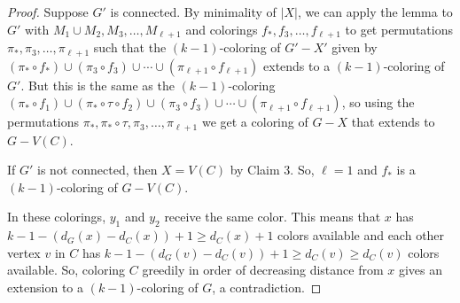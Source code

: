 \documentclass[12pt]{article}
\theoremstyle{plain}
\theoremstyle{definition}
\theoremstyle{remark}
\begin{document}
\begin{proof}
Suppose $G'$ is connected. By minimality of $|X|$, we can apply the lemma to $G'$ with $M_1 \cup M_2, M_3, \ldots, M_{\ell + 1}$ and colorings $f_*, f_3, \ldots, f_{\ell +1}$ to get permutations $\pi_*, \pi_3, \ldots, \pi_{\ell+1}$ such that the $(k-1)$-coloring of $G'-X'$ given by $(\pi_* \circ f_*) \cup (\pi_3 \circ f_3) \cup \cdots \cup (\pi_{\ell + 1} \circ f_{\ell + 1})$ extends to a $(k - 1)$-coloring of $G'$.  But this is the same as the $(k-1)$-coloring $(\pi_* \circ f_1) \cup (\pi_* \circ \tau \circ f_2) \cup (\pi_3 \circ f_3) \cup \cdots \cup (\pi_{\ell + 1} \circ f_{\ell + 1})$, so using the permutations $\pi_*, \pi_* \circ \tau, \pi_3, \ldots, \pi_{\ell + 1}$ we get a coloring of $G - X$ that extends to $G - V(C)$.  

If $G'$ is not connected, then $X = V(C)$ by Claim 3.  So, $\ell = 1$ and $f_*$ is a $(k-1)$-coloring of $G-V(C)$.

In these colorings, $y_1$ and $y_2$ receive the same color. This means that $x$ has $k - 1 - (d_G(x) - d_C(x)) + 1 \ge d_C(x) + 1$ colors available and each other vertex $v$ in $C$ has $k - 1 - (d_G(v) - d_C(v)) + 1 \ge d_C(v) \ge d_C(v)$ colors available.  So, coloring $C$ greedily in order of decreasing distance from $x$ gives an extension to a $(k - 1)$-coloring of $G$, a contradiction.
\end{proof}



\end{document}
